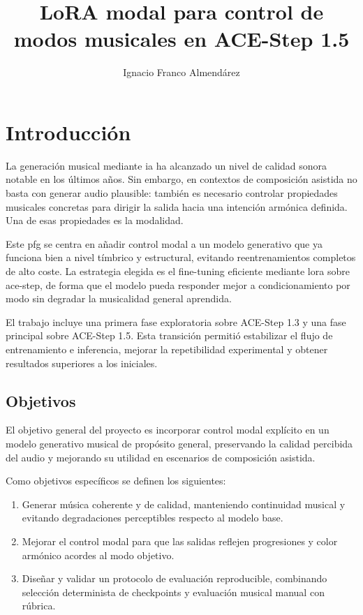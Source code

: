 \documentclass[%
    school=etsisi,%
    type=pfg,%
    degree=61CD,%
]{upm-report}
\title{LoRA modal para control de modos musicales en ACE-Step 1.5}
\author{Ignacio Franco Almend\'arez}
\begin{document}
\chapter{Introducci\'on}
\label{ch:introduccion}

La generaci\'on musical mediante \gls{ia} ha alcanzado un nivel de calidad sonora notable en los \'ultimos a\~nos. Sin embargo, en contextos de composici\'on asistida no basta con generar audio plausible: tambi\'en es necesario controlar propiedades musicales concretas para dirigir la salida hacia una intenci\'on arm\'onica definida. Una de esas propiedades es la modalidad.

Este \gls{pfg} se centra en a\~nadir control modal a un modelo generativo que ya funciona bien a nivel t\'imbrico y estructural, evitando reentrenamientos completos de alto coste. La estrategia elegida es el fine-tuning eficiente mediante \gls{lora} sobre \gls{ace-step}, de forma que el modelo pueda responder mejor a condicionamiento por modo sin degradar la musicalidad general aprendida.

El trabajo incluye una primera fase exploratoria sobre ACE-Step 1.3 y una fase principal sobre ACE-Step 1.5. Esta transici\'on permiti\'o estabilizar el flujo de entrenamiento e inferencia, mejorar la repetibilidad experimental y obtener resultados superiores a los iniciales.

\section{Objetivos}

El objetivo general del proyecto es incorporar control modal expl\'icito en un modelo generativo musical de prop\'osito general, preservando la calidad percibida del audio y mejorando su utilidad en escenarios de composici\'on asistida.

Como objetivos espec\'ificos se definen los siguientes:

\begin{enumerate}
    \item Generar m\'usica coherente y de calidad, manteniendo continuidad musical y evitando degradaciones perceptibles respecto al modelo base.
    \item Mejorar el control modal para que las salidas reflejen progresiones y color arm\'onico acordes al modo objetivo.
    \item Dise\~nar y validar un protocolo de evaluaci\'on reproducible, combinando selecci\'on determinista de checkpoints y evaluaci\'on musical manual con r\'ubrica.
\end{enumerate}
\end{document}
